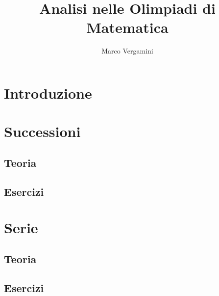 \documentclass{article}
\title{Analisi nelle Olimpiadi di Matematica}
\date{}
\author{Marco Vergamini}
\begin{document}
\maketitle
\newpage
\tableofcontents
\newpage


\section*{Introduzione}


\newpage

\section{Successioni}

\subsection{Teoria}

\subsection{Esercizi}

\newpage

\section{Serie}

\subsection{Teoria}

\subsection{Esercizi}

\newpage
\end{document}
